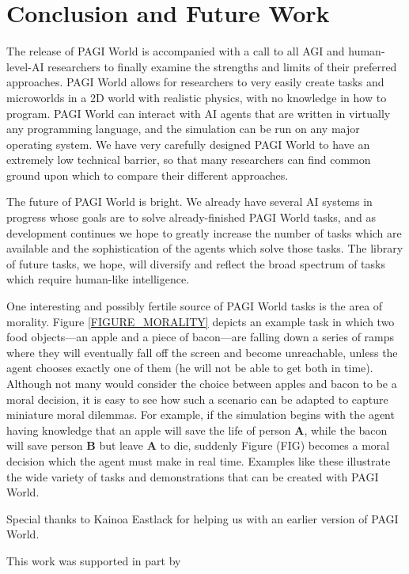 \section{Conclusion and Future Work}

The release of PAGI World is accompanied with a call to all AGI and human-level-AI researchers to finally examine the strengths and limits of their preferred approaches. PAGI World allows for researchers to very easily create tasks and microworlds in a 2D world with realistic physics, with no knowledge in how to program. PAGI World can interact with AI agents that are written in virtually any programming language, and the simulation can be run on any major operating system. We have very carefully designed PAGI World to have an extremely low technical barrier, so that many researchers can find common ground upon which to compare their different approaches.

The future of PAGI World is bright. We already have several AI systems in progress whose goals are to solve already-finished PAGI World tasks, and as development continues we hope to greatly increase the number of tasks which are available and the sophistication of the agents which solve those tasks. The library of future tasks, we hope, will diversify and reflect the broad spectrum of tasks which require human-like intelligence. 

One interesting and possibly fertile source of PAGI World tasks is the area of morality. Figure \ref{FIGURE_MORALITY} depicts an example task in which two food objects---an apple and a piece of bacon---are falling down a series of ramps where they will eventually fall off the screen and become unreachable, unless the agent chooses exactly one of them (he will not be able to get both in time). Although not many would consider the choice between apples and bacon to be a moral decision, it is easy to see how such a scenario can be adapted to capture miniature moral dilemmas. For example, if the simulation begins with the agent having knowledge that an apple will save the life of person \textbf{A}, while the bacon will save person \textbf{B} but leave \textbf{A} to die, suddenly Figure (FIG) becomes a moral decision which the agent must make in real time. Examples like these illustrate the wide variety of tasks and demonstrations that can be created with PAGI World.

Special thanks to Kainoa Eastlack for helping us with an earlier version of PAGI World.

This work was supported in part by 

